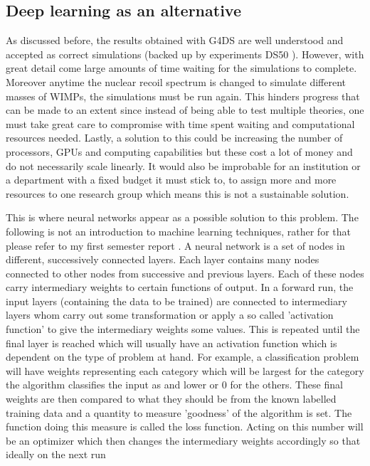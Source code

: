 \documentclass[11pt]{article} %
\begin{document}
\subsection{Deep learning as an alternative}
As discussed before, the results obtained with G4DS are well understood and accepted as correct simulations (backed up by experiments DS50 \cite{agnes2015first}).
However, with great detail come large amounts of time waiting for the simulations to complete.
Moreover anytime the nuclear recoil spectrum is changed to simulate different masses of WIMPs, the simulations must be run again.
This hinders progress that can be made to an extent since instead of being able to test multiple theories, one must take great care to compromise with time spent waiting and computational resources needed.
Lastly, a solution to this could be increasing the number of processors, GPUs and computing capabilities but these cost a lot of money and do not necessarily scale linearly.
It would also be improbable for an institution or a department with a fixed budget it must stick to, to assign more and more resources to one research group which means this is
not a sustainable solution.
\\
\par This is where neural networks appear as a possible solution to this problem.
The following is not an introduction to machine learning techniques, rather for that please refer to my first semester report \cite{firstsemester}.
A neural network is a set of nodes in different, successively connected layers.
Each layer contains many nodes connected to other nodes from successive and previous layers.
Each of these nodes carry intermediary weights to certain functions of output.
In a forward run, the input layers (containing the data to be trained) are connected to
intermediary layers whom carry out some transformation or apply a so called 'activation function' to give
the intermediary weights some values.
This is repeated until the final layer is reached which will usually have an activation function which is dependent on the type of problem at hand.
For example, a classification problem will have weights representing each category which will be largest for the category the algorithm classifies the input as and lower or 0 for the others.
These final weights are then compared to what they should be from the known labelled training data and a quantity to measure 'goodness' of the algorithm is set.
The function doing this measure is called the loss function.
Acting on this number will be an optimizer which then changes the intermediary weights accordingly so that ideally on the next run
\end{document}
